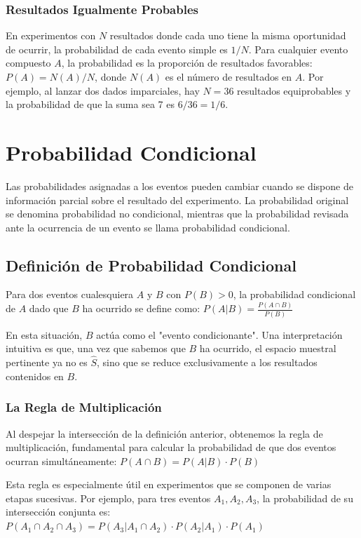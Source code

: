 \documentclass[a4paper]{article}
\begin{document}
\subsubsection{Resultados Igualmente Probables}

En experimentos con $N$ resultados donde cada uno tiene la misma oportunidad de ocurrir, la probabilidad de cada evento simple es $1/N$. Para cualquier evento compuesto $A$, la probabilidad es la proporción de resultados favorables: $P(A) = N(A)/N$, donde $N(A)$ es el número de resultados en $A$. Por ejemplo, al lanzar dos dados imparciales, hay $N = 36$ resultados equiprobables y la probabilidad de que la suma sea 7 es $6/36 = 1/6$.

\section{Probabilidad Condicional}

Las probabilidades asignadas a los eventos pueden cambiar cuando se dispone de información parcial sobre el resultado del experimento. La probabilidad original se denomina probabilidad no condicional, mientras que la probabilidad revisada ante la ocurrencia de un evento se llama probabilidad condicional.

\subsection{Definición de Probabilidad Condicional}

Para dos eventos cualesquiera $A$ y $B$ con $P(B) > 0$, la probabilidad condicional de $A$ dado que $B$ ha ocurrido se define como:
$P(A | B) = \frac{P(A \cap B)}{P(B)}$

En esta situación, $B$ actúa como el "evento condicionante". Una interpretación intuitiva es que, una vez que sabemos que $B$ ha ocurrido, el espacio muestral pertinente ya no es $\hat{S}$, sino que se reduce exclusivamente a los resultados contenidos en $B$.

\subsubsection{La Regla de Multiplicación}

Al despejar la intersección de la definición anterior, obtenemos la regla de multiplicación, fundamental para calcular la probabilidad de que dos eventos ocurran simultáneamente:
$P(A \cap B) = P(A | B) \cdot P(B)$

Esta regla es especialmente útil en experimentos que se componen de varias etapas sucesivas. Por ejemplo, para tres eventos $A_1, A_2, A_3$, la probabilidad de su intersección conjunta es:
$P(A_1 \cap A_2 \cap A_3) = P(A_3 | A_1 \cap A_2) \cdot P(A_2 | A_1) \cdot P(A_1)$
\end{document}
